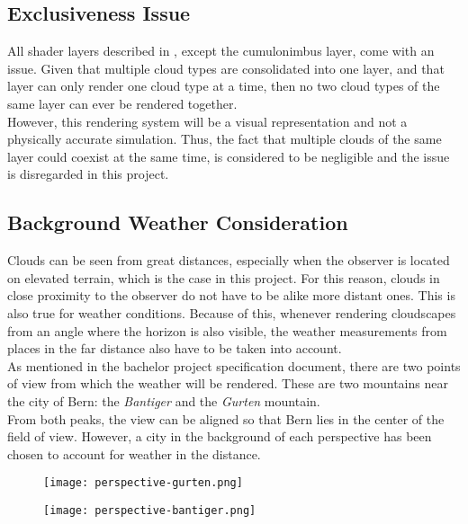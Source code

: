 \subsection{Exclusiveness Issue}
All \gls{shader} layers described in , except the cumulonimbus layer, come with an issue.
Given that multiple cloud types are consolidated into one layer, and that layer can only render one cloud type at a time, then no two cloud types of the same layer can ever be rendered together.
\\
However, this rendering system will be a visual representation and not a physically accurate simulation.
Thus, the fact that multiple clouds of the same layer could coexist at the same time, is considered to be negligible and the issue is disregarded in this project.

\pagebreak

\subsection{Background Weather Consideration}
Clouds can be seen from great distances, especially when the observer is located on elevated terrain, which is the case in this project.
For this reason, clouds in close proximity to the observer do not have to be alike more distant ones.
This is also true for weather conditions.
Because of this, whenever rendering cloudscapes from an angle where the horizon is also visible, the weather measurements from places in the far distance also have to be taken into account.
\\
As mentioned in the bachelor project specification document, there are two points of view from which the weather will be rendered.
These are two mountains near the city of Bern: the \emph{Bantiger} and the \emph{Gurten} mountain.
\\
From both peaks, the view can be aligned so that Bern lies in the center of the field of view. However, a city in the background of each perspective has been chosen to account for weather in the distance.

\begin{figure}[H]
    \centering
        \begin{minipage}{0.47\linewidth}
            \texttt{[image: perspective-gurten.png]}
            \label{img:noise:fbm10_1}
        \end{minipage}
    \hfill
        \begin{minipage}{0.47\linewidth}
            \texttt{[image: perspective-bantiger.png]}
            \label{img:noise:fbm10_2}
        \end{minipage}
\end{figure}

